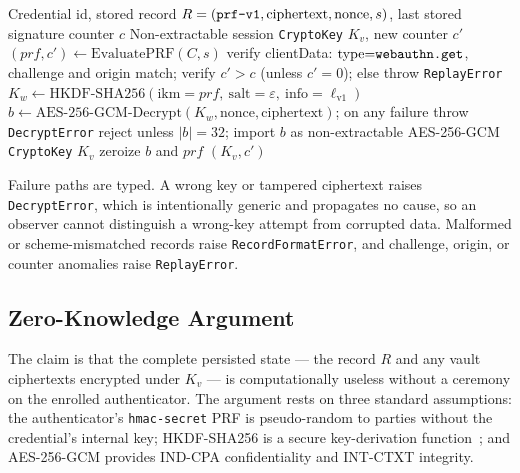 \documentclass[runningheads]{llncs}
\begin{document}
\begin{algorithm}[h]
  \caption{Vault key unwrapping (\texttt{unlockVault} $\to$ \texttt{unwrapSecret})}
  \label{alg:unwrap}
  \begin{algorithmic}[1]
    \Require Credential id, stored record $R=(\text{\texttt{prf-v1}}, \mathrm{ciphertext}, \mathrm{nonce}, s)$, last stored signature counter $c$
    \Ensure Non-extractable session \texttt{CryptoKey} $K_v$, new counter $c'$
    \State $(prf, c') \gets \mathrm{EvaluatePRF}(C, s)$ 
    \State verify clientData: $\mathrm{type}{=}\text{\texttt{webauthn.get}}$, challenge and origin match; verify $c' > c$ (unless $c'{=}0$); else throw \texttt{ReplayError}
    \State $K_w \gets \mathrm{HKDF\text{-}SHA256}(\mathrm{ikm}{=}prf,\ \mathrm{salt}{=}\varepsilon,\ \mathrm{info}{=}\ell_{\mathrm{v1}})$
    \State $b \gets \mathrm{AES\text{-}256\text{-}GCM\text{-}Decrypt}(K_w, \mathrm{nonce}, \mathrm{ciphertext})$; on any failure throw \texttt{DecryptError} 
    \State reject unless $|b| = 32$; import $b$ as non-extractable AES-256-GCM \texttt{CryptoKey} $K_v$
    \State zeroize $b$ and $prf$ 
    \State \Return $(K_v, c')$ 
  \end{algorithmic}
\end{algorithm}

Failure paths are typed.
A wrong key or tampered ciphertext raises \texttt{DecryptError}, which is intentionally generic and propagates no cause, so an observer cannot distinguish a wrong-key attempt from corrupted data.
Malformed or scheme-mismatched records raise \texttt{RecordFormatError}, and challenge, origin, or counter anomalies raise \texttt{ReplayError}.

\subsection{Zero-Knowledge Argument}
\label{sec:zk}
The claim is that the complete persisted state --- the record $R$ and any vault ciphertexts encrypted under $K_v$ --- is computationally useless without a ceremony on the enrolled authenticator.
The argument rests on three standard assumptions: the authenticator's \texttt{hmac-secret} PRF is pseudo-random to parties without the credential's internal key; HKDF-SHA256 is a secure key-derivation function~\cite{rfc5869}; and AES-256-GCM provides IND-CPA confidentiality and INT-CTXT integrity.
\end{document}
